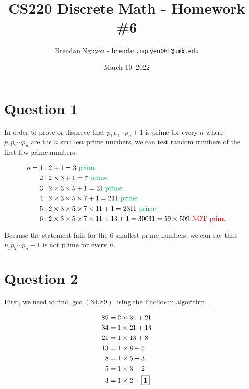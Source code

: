 \documentclass[11pt]{article}
\title{CS220 Discrete Math - Homework \#6}
\author{Brendan Nguyen - \texttt{brendan.nguyen001@umb.edu}}
\date{March 10, 2022}
\begin{document}
\maketitle

\section*{Question 1}
In order to prove or disprove that $p_{1}p_{2} \cdots p_n + 1$ is prime for every $n$ where $p_{1}p_{2} \cdots p_n$ are the $n$ smallest prime numbers, we can test random numbers of the first few prime numbers.

\begin{align*}
    n = 1 &: 2 + 1 = 3 \text{ \textcolor{Green}{prime}}\\
    2 &: 2 \times 3 + 1 = 7 \text{ \textcolor{Green}{prime}}\\
    3 &: 2 \times 3 \times 5 + 1 = 31 \text{ \textcolor{Green}{prime}}\\
    4 &: 2 \times 3 \times 5 \times 7 + 1 = 211 \text{ \textcolor{Green}{prime}}\\
    5 &: 2 \times 3 \times 5 \times 7 \times 11 + 1 = 2311 \text{ \textcolor{Green}{prime}}\\
    6 &: 2 \times 3 \times 5 \times 7 \times 11 \times 13 + 1 = 30031 = 59 \times 509 \text{ \textcolor{red}{NOT prime}}\\
\end{align*}

Because the statement fails for the 6 smallest prime numbers, we can say that $p_{1}p_{2} \cdots p_n + 1$ is not prime for every $n$.

\section*{Question 2}
First, we need to find $\gcd(34, 89)$ using the Euclidean algorithm.

\begin{align*}
    89 &= 2 \times 34 + 21\\
    34 &= 1 \times 21 + 13\\
    21 &= 1 \times 13 + 8\\
    13 &= 1 \times 8 + 5\\
    8 &= 1 \times 5 + 3\\
    5 &= 1 \times 3 + 2\\
    3 &= 1 \times 2 + \fbox{\textbf{1}}\\
\end{align*}
\end{document}
